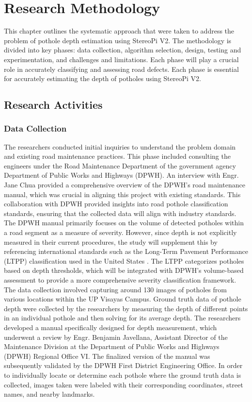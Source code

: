 \chapter{Research Methodology}
This chapter outlines the systematic approach that were taken to address the problem of pothole depth estimation using StereoPi V2. The methodology is divided into key phases: data collection, algorithm selection, design, testing and experimentation, and challenges and limitations. Each phase will play a crucial role in accurately classifying and assessing road defects.  Each phase is essential for accurately estimating the depth of potholes using StereoPi V2. 

\section{ Research Activities}

\subsection{Data Collection}
The researchers conducted initial inquiries to understand the problem domain and existing road maintenance practices. This phase included consulting the engineers under the Road Maintenance Department of the government agency Department of Public Works and Highways (DPWH). An interview with Engr. Jane Chua provided a comprehensive overview of the DPWH's road maintenance manual, which was crucial in aligning this project with existing standards. This collaboration with DPWH provided insights into road pothole classification standards, ensuring that the collected data will align with industry standards. The DPWH manual primarily focuses on the volume of detected potholes within a road segment as a measure of severity. However, since depth is not explicitly measured in their current procedures, the study will supplement this by referencing international standards such as the Long-Term Pavement Performance (LTPP) classification used in the United States \cite{miller2014}. The LTPP categorizes potholes based on depth thresholds, which will be integrated with DPWH’s volume-based assessment to provide a more comprehensive severity classification framework. The data collection involved capturing around 130 images of potholes from various locations within the UP Visayas Campus. Ground truth data of pothole depth were collected by the researchers by measuring the depth of different points in an individual pothole and then solving for its average depth. The researchers developed a manual specifically designed for depth measurement, which underwent a review by Engr. Benjamin Javellana, Assistant Director of the Maintenance Division at the Department of Public Works and Highways (DPWH) Regional Office VI. The finalized version of the manual was subsequently validated by the DPWH First District Engineering Office. In order to individually locate or determine each pothole where the ground truth data is collected, images taken were labeled with their corresponding coordinates, street names, and nearby landmarks.

